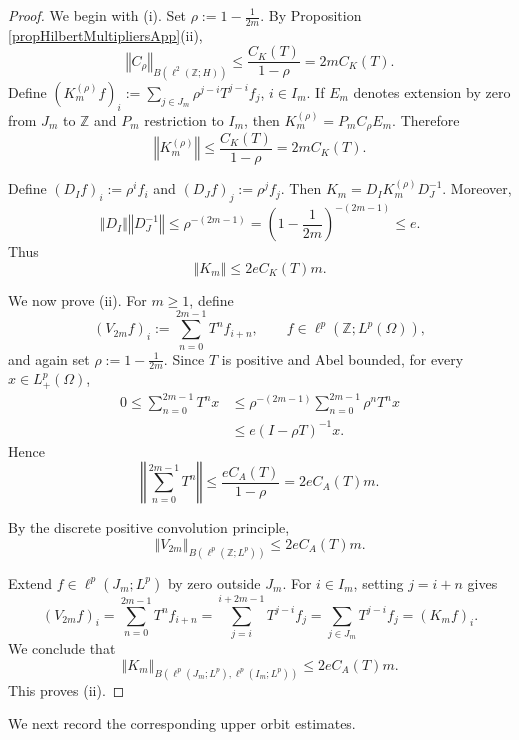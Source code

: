 \documentclass[12pt]{amsart}
\theoremstyle{plain}
\theoremstyle{remark}
\theoremstyle{definition}
\newcommand{\Z}{\mathbb{Z}}
\newcommand{\norm}[1]{\left\Vert #1\right\Vert}
\begin{document}
	\begin{proof}
		We begin with (i). Set $\rho:=1-\frac1{2m}$. By Proposition \ref{propHilbertMultipliersApp}(ii),
		\begin{equation*}\label{eqCrDiscreteBound}
			\norm{C_\rho}_{B(\ell^2(\Z;H))} \le \frac{C_K(T)}{1-\rho}=2mC_K(T).
		\end{equation*}
		Define $(K_m^{(\rho)}f)_i := \sum_{j\in J_m} \rho^{j-i}T^{j-i}f_j$, $i\in I_m$. If $E_m$ denotes extension by zero from $J_m$ to $\Z$ and $P_m$ restriction to $I_m$, then $K_m^{(\rho)} = P_mC_\rho E_m$. Therefore
		\[
		\norm{K_m^{(\rho)}} \le \frac{C_K(T)}{1-\rho} = 2mC_K(T).
		\]
		
		Define $(D_If)_i:=\rho^if_i$ and $(D_Jf)_j:=\rho^jf_j$. Then $K_m = D_IK_m^{(\rho)}D_J^{-1}$. Moreover,
		\[
		\norm{D_I}\norm{D_J^{-1}} \le \rho^{-(2m-1)} = \left(1-\frac1{2m}\right)^{-(2m-1)} \le e.
		\]
		Thus
		\[
		\norm{K_m} \le 2eC_K(T)m.
		\]
		\medskip
		
		We now prove (ii). For $m\ge1$, define
		\[
		(V_{2m}f)_i
		:=
		\sum_{n=0}^{2m-1}T^nf_{i+n},
		\qquad
		f\in \ell^p(\Z;L^p(\Omega)),
		\]
		and again set $\rho:=1-\frac1{2m}$. Since $T$ is positive and Abel bounded, for every
		$x\in L^p_+(\Omega)$,
		\begin{align*}
			0
			\le
			\sum_{n=0}^{2m-1}T^nx
			&\le
			\rho^{-(2m-1)}
			\sum_{n=0}^{2m-1}\rho^nT^nx\\
			&\le
			e(I-\rho T)^{-1}x.
		\end{align*}
		Hence
		\begin{equation*}\label{eqPartialSumPositiveDiscrete}
			\norm{\sum_{n=0}^{2m-1}T^n}
			\le
			\frac{eC_A(T)}{1-\rho}
			=
			2eC_A(T)m.
		\end{equation*}
		
		By the discrete positive convolution principle,
		\[
		\norm{V_{2m}}_{B(\ell^p(\Z;L^p))}
		\le
		2eC_A(T)m.
		\]
		
		Extend $f\in\ell^p(J_m;L^p)$ by zero outside $J_m$. For $i\in I_m$, setting $j=i+n$ gives
		\[
		( V_{2m}f)_i 
		= \sum_{n=0}^{2m-1}T^n f_{i+n} 
		= \sum_{j=i}^{i+2m-1} T^{j-i} f_j 
		= \sum_{j\in J_m} T^{j-i} f_j 
		= (K_mf)_i.
		\]
		We conclude that
		\[
		\norm{K_m}_{
			B(\ell^p(J_m;L^p),\ell^p(I_m;L^p))}
		\le
		2eC_A(T)m.
		\]
		This proves (ii).
	\end{proof}
	
	We next record the corresponding upper orbit estimates.
	
\end{document}

